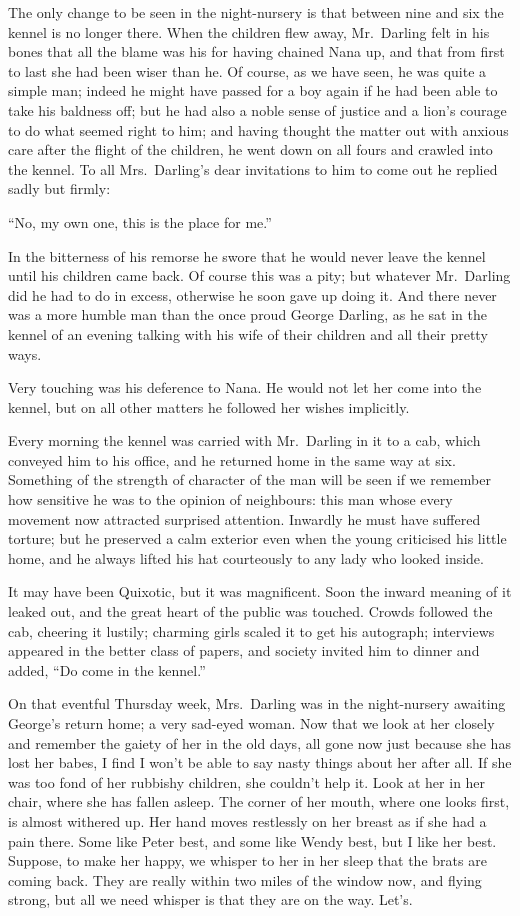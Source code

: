 The only change to be seen in the night-nursery is that between nine
and six the kennel is no longer there. When the children flew away, Mr.\ Darling felt in his bones that all the blame was his for having chained
Nana up, and that from first to last she had been wiser than he. Of
course, as we have seen, he was quite a simple man; indeed he might
have passed for a boy again if he had been able to take his baldness
off; but he had also a noble sense of justice and a lion's courage to
do what seemed right to him; and having thought the matter out with
anxious care after the flight of the children, he went down on all
fours and crawled into the kennel. To all Mrs.\ Darling's dear
invitations to him to come out he replied sadly but firmly:

``No, my own one, this is the place for me.''

In the bitterness of his remorse he swore that he would never leave the
kennel until his children came back. Of course this was a pity; but
whatever Mr.\ Darling did he had to do in excess, otherwise he soon gave
up doing it. And there never was a more humble man than the once proud
George Darling, as he sat in the kennel of an evening talking with his
wife of their children and all their pretty ways.

Very touching was his deference to Nana. He would not let her come into
the kennel, but on all other matters he followed her wishes implicitly.

Every morning the kennel was carried with Mr.\ Darling in it to a cab,
which conveyed him to his office, and he returned home in the same way
at six. Something of the strength of character of the man will be seen
if we remember how sensitive he was to the opinion of neighbours: this
man whose every movement now attracted surprised attention. Inwardly he
must have suffered torture; but he preserved a calm exterior even when
the young criticised his little home, and he always lifted his hat
courteously to any lady who looked inside.

It may have been Quixotic, but it was magnificent. Soon the inward
meaning of it leaked out, and the great heart of the public was
touched. Crowds followed the cab, cheering it lustily; charming girls
scaled it to get his autograph; interviews appeared in the better class
of papers, and society invited him to dinner and added, ``Do come in the
kennel.''

On that eventful Thursday week, Mrs.\ Darling was in the night-nursery
awaiting George's return home; a very sad-eyed woman. Now that we look
at her closely and remember the gaiety of her in the old days, all gone
now just because she has lost her babes, I find I won't be able to say
nasty things about her after all. If she was too fond of her rubbishy
children, she couldn't help it. Look at her in her chair, where she has
fallen asleep. The corner of her mouth, where one looks first, is
almost withered up. Her hand moves restlessly on her breast as if she
had a pain there. Some like Peter best, and some like Wendy best, but I
like her best. Suppose, to make her happy, we whisper to her in her
sleep that the brats are coming back. They are really within two miles
of the window now, and flying strong, but all we need whisper is that
they are on the way. Let's.

